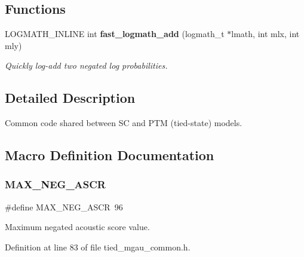 \subsection*{Functions}
\begin{DoxyCompactItemize}
\item 
L\+O\+G\+M\+A\+T\+H\+\_\+\+I\+N\+L\+I\+NE int \textbf{ fast\+\_\+logmath\+\_\+add} (logmath\+\_\+t $\ast$lmath, int mlx, int mly)
\begin{DoxyCompactList}\small\item\em Quickly log-\/add two negated log probabilities. \end{DoxyCompactList}\end{DoxyCompactItemize}


\subsection{Detailed Description}
Common code shared between SC and P\+TM (tied-\/state) models. 



\subsection{Macro Definition Documentation}
\mbox{\label{tied__mgau__common_8h_a965d50d73044c3f2dc2589662fd2e89e}} 
\subsubsection{M\+A\+X\+\_\+\+N\+E\+G\+\_\+\+A\+S\+CR}
{\footnotesize\ttfamily \#define M\+A\+X\+\_\+\+N\+E\+G\+\_\+\+A\+S\+CR~96}



Maximum negated acoustic score value. 



Definition at line 83 of file tied\+\_\+mgau\+\_\+common.\+h.

\mbox{\label{tied__mgau__common_8h_ad739d757ed78293c18dc2386fd3b750e}} 
